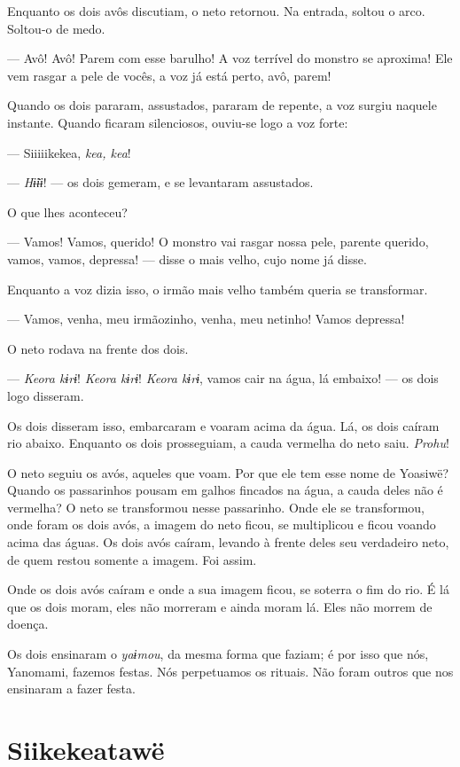 Enquanto os dois avôs discutiam, o neto retornou. Na entrada, soltou o
arco. Soltou-o de medo. 

--- Avô! Avô! Parem com esse barulho! A voz terrível do monstro se
aproxima! Ele vem rasgar a pele de vocês, a voz já está perto, avô,
parem! 

Quando os dois pararam, assustados, pararam de repente, a voz surgiu
naquele instante. Quando ficaram silenciosos, ouviu-se logo a voz
forte: 

--- Siiiiikekea, \textit{kea, kea}! 

--- \textit{Hɨ̃ɨɨ}! --- os dois gemeram, e se levantaram assustados. 

O que lhes aconteceu?

--- Vamos! Vamos, querido! O monstro vai rasgar nossa pele, parente
querido, vamos, vamos, depressa! --- disse o mais velho, cujo nome já
disse. 

Enquanto a voz dizia isso, o irmão mais velho também queria se
transformar. 

--- Vamos, venha, meu irmãozinho, venha, meu netinho! Vamos depressa!

O neto rodava na frente dos dois. 

--- \textit{Keora kɨrɨ}! \textit{Keora kɨrɨ}! \textit{Keora kɨrɨ}, vamos cair na água, lá
embaixo! --- os dois logo disseram. 

Os dois disseram isso, embarcaram e voaram acima da água. Lá, os dois
caíram rio abaixo. Enquanto os dois prosseguiam, a cauda vermelha do
neto saiu. \textit{Prohu}! 

O neto seguiu os avós, aqueles que voam. Por que ele tem esse nome de
Yoasiwë? Quando os passarinhos pousam em galhos fincados na água, a
cauda deles não é vermelha? O neto se transformou nesse passarinho. Onde
ele se transformou, onde foram os dois avós, a imagem do neto ficou, se
multiplicou e ficou voando acima das águas. Os dois avós caíram, levando
à frente deles seu verdadeiro neto, de quem restou somente a imagem.
Foi assim. 

Onde os dois avós caíram e onde a sua imagem ficou, se soterra o fim do
rio. É lá que os dois moram, eles não morreram e ainda moram lá. Eles
não morrem de doença. 

Os dois ensinaram o \textit{yaɨmou}, da mesma forma que faziam; é por isso que nós, Yanomami, fazemos festas. Nós perpetuamos os rituais. Não foram outros que nos ensinaram a fazer festa.

\chapter{Siikekeatawë}
 
